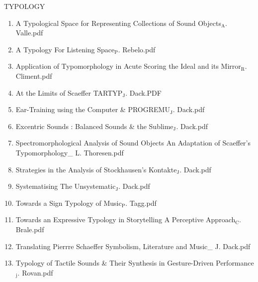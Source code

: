 \documentclass[11pt]{article}
\begin{document}
\item TYPOLOGY
\label{sec-1-1-1-1-49-1-38}
\begin{enumerate}
\item A Typological Space for Representing Collections of Sound Objects$_{\text{A}}$. Valle.pdf
\label{sec-1-1-1-1-49-1-38-1}

\item A Typology For Listening Space$_{\text{P}}$. Rebelo.pdf
\label{sec-1-1-1-1-49-1-38-2}

\item Application of Typomorphology in Acute Scoring the Ideal and its Mirror$_{\text{R}}$. Climent.pdf
\label{sec-1-1-1-1-49-1-38-3}

\item At the Limits of Scaeffer TARTYP$_{\text{J}}$. Dack.PDF
\label{sec-1-1-1-1-49-1-38-4}

\item Ear-Training using the Computer \& PROGREMU$_{\text{J}}$. Dack.pdf
\label{sec-1-1-1-1-49-1-38-5}

\item Excentric Sounds : Balanced Sounds \& the Sublime$_{\text{J}}$. Dack.pdf
\label{sec-1-1-1-1-49-1-38-6}

\item Spectromorphological Analysis of Sound Objects An Adaptation of Scaeffer's Typomorphology\_ L. Thoresen.pdf
\label{sec-1-1-1-1-49-1-38-7}

\item Strategies in the Analysis of Stockhausen's Kontakte$_{\text{J}}$. Dack.pdf
\label{sec-1-1-1-1-49-1-38-8}

\item Systematising The Unsystematic$_{\text{J}}$. Dack.pdf
\label{sec-1-1-1-1-49-1-38-9}

\item Towards a Sign Typology of Music$_{\text{P}}$. Tagg.pdf
\label{sec-1-1-1-1-49-1-38-10}

\item Towards an Expressive Typology in Storytelling A Perceptive Approach$_{\text{C}}$. Brale.pdf
\label{sec-1-1-1-1-49-1-38-11}

\item Translating Pierrre Schaeffer Symbolism, Literature and Music\_ J. Dack.pdf
\label{sec-1-1-1-1-49-1-38-12}

\item Typology of Tactile Sounds \& Their Synthesis in Gesture-Driven Performance$_{\text{j}}$. Rovan.pdf
\label{sec-1-1-1-1-49-1-38-13}


\end{enumerate}
\end{document}
